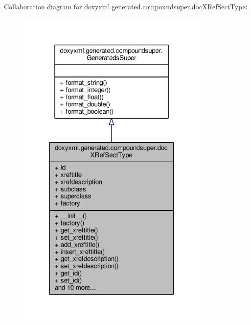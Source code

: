 Collaboration diagram for doxyxml.\+generated.\+compoundsuper.\+doc\+X\+Ref\+Sect\+Type\+:
\nopagebreak
\begin{figure}[H]
\begin{center}
\leavevmode
\includegraphics[width=270pt]{dd/daa/classdoxyxml_1_1generated_1_1compoundsuper_1_1docXRefSectType__coll__graph}
\end{center}
\end{figure}
